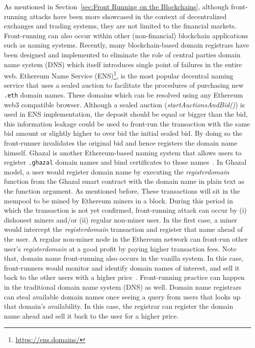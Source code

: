 As mentioned in Section~\ref{sec:Front Running on the Blockchains}, although front-running attacks have been more showcased in the context of decentralized exchanges and trading systems, they are not limited to the financial markets. Front-running can also occur within other (non-financial) blockchain applications such as naming systems. Recently, many blockchain-based domain registrars have been designed and implemented to eliminate the role of central parties \ie domain name system (DNS) which itself introduces single point of failures in the entire web. Ethereum Name Service (ENS)\footnote{\url{https://ens.domains/}}, is the most popular decentral naming service that uses a sealed auction to facilitate the procedures of purchasing new \texttt{.eth} domain names. These domains which can be resolved using any Ethereum web3 compatible browser. Although a sealed auction (\textit{startAuctionsAndBid()}) is used in ENS implementation, the deposit should be equal or bigger than the bid, this information leakage could be used to front-run the transaction with the same bid amount or slightly higher to over bid the initial sealed bid. By doing so the front-runner invalidates the original bid and hence registers the domain name himself. Ghazal is another Ethereum-based naming system that allows users to register \texttt{.ghazal} domain names and bind certificates to those names~\cite{moosavighazal}.  In Ghazal model, a user would register domain name by executing the \textit{registerdomain} function from the Ghazal smart contract with the domain name in plain text as the function argument. As mentioned before, These transactions will sit in the mempool to be mined by Ethereum miners in a block. During this period in which the transaction is not yet confirmed, front-running attack can occur by (i) dishonest miners and/or (ii) regular non-miner user. In the first case, a miner would intercept the \textit{registerdomain} transaction and register that name ahead of the user. A regular non-miner node in the Ethereum network can front-run other user's \textit{registerdomain} at a good profit by paying higher transaction fees. Note that, domain name front-running also occurs in the vanilla system. In this case, front-runners would monitor and identify domain names of interest, and sell it back to the other users with a higher price~\cite{sac022en33:online}. Front-running practice can happen in the traditional domain name system (DNS) as well. Domain name registrars can steal available domain names once seeing a query from users that looks up that domain's availability. In this case, the registrar can register the domain name ahead and sell it back to the user for a higher price.
